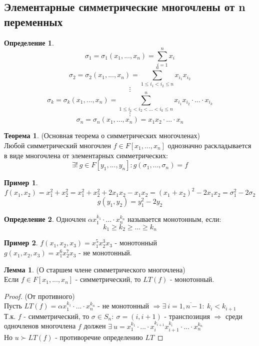 \documentclass[a4paper, 12pt]{article}
\newcommand\tab[1][.5cm]{\hspace*{#1}}
\newcounter{lemcount}
\newcounter{lemcount2}
\newcounter{thcount}
\theoremstyle{definition}
\newtheorem*{definition}{Определение}
\newtheorem*{example1}{Пример}
\newtheorem{lemmanum}[lemcount]{Лемма}
\newtheorem{theoremnum}[thcount]{Теорема}
\begin{document}
   \subsection{Элементарные симметрические многочлены от n переменных}
   \begin{definition}
    $$\sigma_1 = \sigma_1(x_1,...,x_n) = \sum \limits_{i=1}^n x_i$$
    $$\sigma_2 = \sigma_2(x_1,...,x_n) = \sum \limits_{1\leq i_1 < i_2 \leq n}^n x_{i_1}x_{i_2}$$
    $$\vdots$$ 
    $$\sigma_k = \sigma_k(x_1,...,x_n) = \sum \limits_{1\leq i_1 < i_2<...<i_k \leq n}^n x_{i_1}x_{i_2} \cdot ... \cdot x_{i_k}$$
    $$\vdots$$
    $$\sigma_n = \sigma_n(x_1,...,x_n) = x_{1}x_{2} \cdot ... \cdot x_{n}$$      
   \end{definition}
   \begin{theoremnum} (Основная теорема о симметрических многочленах)\\
    Любой симметрический многочлен $f \in F[x_1,...,x_n]$ однозначно раскладывается в виде многочлена от элементарных симметрических: 
    $$\exists ! \ g \in F[y_1,...,y_n] : g(\sigma_1,...,\sigma_n) = f$$
   \end{theoremnum}
   \begin{example1}
    $$f(x_1, x_2) = x_1^2 + x_2^2 = x_1^2 + x_2^2 + 2x_1x_2 - x_1x_2 = (x_1+x_2)^2 - 2x_1x_2 = \sigma_1^2 - 2 \sigma_2$$
    $$g(y_1,y_2) = y_1^2 - 2y_2$$  
   \end{example1}
   \begin{definition}
    Одночлен $\alpha x_1^{k_1} \cdot ... \cdot x_n^{k_n}$ называется монотонным, если: 
    $$k_1\geq k_2 \geq ... \geq k_n$$  
   \end{definition}
   \begin{example1}
    $f(x_1,x_2,x_3) = x_1^5x_2^3x_3$ - монотонный \\
    \tab[2.33cm]$g(x_1,x_2,x_3) = x_1^6x_2^7x_3$ - не монотонный.  
   \end{example1}
   \setcounter{lemcount}{0}
   \begin{lemmanum} (О старшем члене симметрического многочлена)\\
    Если $f \in F[x_1,...,x_n]$ - симметрический, то $LT(f)$ - монотонный. 
   \end{lemmanum}
   \begin{proof} (От противного)\\
    Пусть $LT(f) = \alpha x_1^{k_1} \cdot ... \cdot x_n^{k_n}$ - не монотонный $\Longrightarrow \exists \ i = \overline{1,n-1}: \ k_i<k_{i+1}$\\
    Т.к. $f$ - симметрический, то $\sigma \in S_n: \ \sigma = (i, i+1)$ - транспозиция $\Longrightarrow $ среди одночленов многочлена $f$ должен $\exists \ u = x_1^{k_1} \cdot ... \cdot x_i^{k_{i+1}}x_{i+1}^{k_i} \cdot ... \cdot x_n^{k_n}$\\
    Но $u \succ LT(f)$ - противоречие определению $LT$    
   \end{proof}
\end{document}
